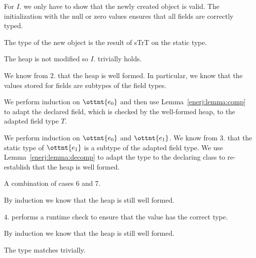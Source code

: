 For $I.$ we only have to show that the newly created object is valid.
The initialization with the null or zero values ensures that all fields are correctly typed.

The type of the new object is the result of sTrT on the static type.




The heap is not modified so $I.$ trivially holds.

We know from $2.$ that the heap is well formed.
In particular, we know that the values stored for fields are subtypes
of the field types.

We perform induction on $\ottnt{e_{{\mathrm{0}}}}$ and then use Lemma~\ref{enerj:lemma:comp}
to adapt the declared field, which is checked by the well-formed heap,
to the adapted field type $T$.



We perform induction on $\ottnt{e_{{\mathrm{0}}}}$ and $\ottnt{e_{{\mathrm{1}}}}$.
We know from $3.$ that the static type of $\ottnt{e_{{\mathrm{1}}}}$ is a subtype of the
adapted field type.
We use Lemma~\ref{enerj:lemma:decomp} to adapt the type to the declaring
class to re-establish that the heap is well formed.



A combination of cases 6 and 7.



By induction we know that the heap is still well formed.

$4.$ performs a runtime check to ensure that the value has the correct
type.



By induction we know that the heap is still well formed.

The type matches trivially.



